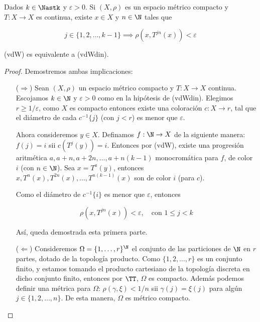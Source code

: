 \begin{teo}[vdWdin]
    Dados $k \in \Nastk$ y $\varepsilon > 0$. Si $(X, \rho)$ es un espacio métrico compacto y $T: X \rightarrow X$ es continua, existe $x \in X$ y $n \in \N$ tales que
    
    \[
    j \in \{ 1, 2, \dots, k-1 \} \implies \rho(x, T^{jn}(x)) < \varepsilon
    \]
\end{teo}

\begin{teo}
    (vdW) es equivalente a (vdWdin).
\end{teo}

\begin{proof}
    Demostremos ambas implicaciones:
    
    \begin{itemize}
        \item[($\Rightarrow$)] Sean $(X, \rho)$ un espacio métrico compacto y $T: X \rightarrow X$ continua. Escojamos $k \in \N$ y $\varepsilon > 0$ como en la hipótesis de (vdWdin). Elegimos $r \geq 1/\varepsilon$, como $X$ es compacto entonces existe una coloración $c: X \rightarrow r$, tal que el diámetro de cada $c^{-1}\{j\}$ (con $j < r$) es menor que $\varepsilon$.
        
        Ahora consideremos $y \in X$. Definamos $f: \N \rightarrow X$ de la siguiente manera: $f(j) = i$ sii $c(T^j(y)) = i$. Entonces por (vdW), existe una progresión aritmética $a, a+n, a+2n, \dots, a+n(k-1)$ monocromática para $f$, de color $i$ (con $n \in \N$). Sea $x = T^a(y)$, entonces $x, T^n(x), T^{2n}(x), \dots, T^{n(k-1)}(x)$ son de color $i$ (para $c$).
        
        Como el diámetro de $c^{-1}\{i\}$ es menor que $\varepsilon$, entonces
        
        \[
        \rho(x, T^{jn}(x)) < \varepsilon, \quad \text{con $1 \leq j < k$}
        \]
        
        Así, queda demostrada esta primera parte.
        
        \item[($\Leftarrow$)] Consideremos $\Omega = \{1, \dots, r\}^{\N}$ el conjunto de las particiones de $\N$ en $r$ partes, dotado de la topología producto. Como $\{1, 2, \dots, r\}$ es un conjunto finito, y estamos tomando el producto cartesiano de la topología discreta en dicho conjunto finito, entonces por $\TT$, $\Omega$ es compacto. Además podemos definir una métrica para $\Omega$: $\rho(\gamma, \xi) < 1/n$ sii $\gamma(j) = \xi(j)$ para algún $j \in \{1, 2, \dots, n\}$. De esta manera, $\Omega$ es métrico compacto.
        

\end{itemize}
\end{proof}
